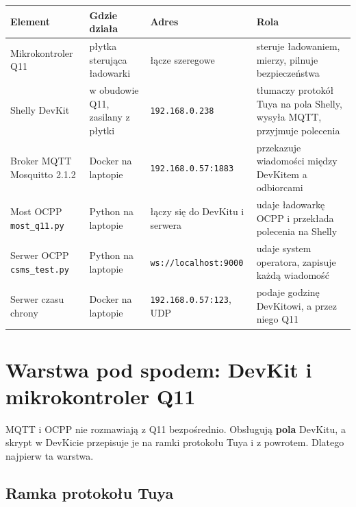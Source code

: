 \documentclass[11pt,a4paper]{article}
\begin{document}
\begin{longtable}{>{\raggedright\arraybackslash}p{3.00cm}>{\raggedright\arraybackslash}p{2.87cm}>{\raggedright\arraybackslash}p{2.57cm}>{\raggedright\arraybackslash}p{6.39cm}}
\toprule
\rowcolor{apteallight}\textbf{Element} & \textbf{Gdzie działa} & \textbf{Adres} & \textbf{Rola} \\
\midrule\endhead
\bottomrule\endfoot
Mikrokontroler Q11 & płytka sterująca ładowarki & łącze szeregowe & steruje ładowaniem, mierzy, pilnuje bezpieczeństwa \\
Shelly DevKit & w obudowie Q11, zasilany z płytki & \texttt{192.\allowbreak{}168.\allowbreak{}0.\allowbreak{}238} & tłumaczy protokół Tuya na pola Shelly, wysyła MQTT, przyjmuje polecenia \\
Broker MQTT Mosquitto 2.1.2 & Docker na laptopie & \texttt{192.\allowbreak{}168.\allowbreak{}0.\allowbreak{}57:\allowbreak{}1883} & przekazuje wiadomości między DevKitem a odbiorcami \\
Most OCPP \texttt{most\_q11.py} & Python na laptopie & łączy się do DevKitu i serwera & udaje ładowarkę OCPP i przekłada polecenia na Shelly \\
Serwer OCPP \texttt{csms\_test.py} & Python na laptopie & \texttt{ws:\allowbreak{}/\allowbreak{}/\allowbreak{}localhost:\allowbreak{}9000} & udaje system operatora, zapisuje każdą wiadomość \\
Serwer czasu chrony & Docker na laptopie & \texttt{192.\allowbreak{}168.\allowbreak{}0.\allowbreak{}57:\allowbreak{}123}, UDP & podaje godzinę DevKitowi, a przez niego Q11 \\
\end{longtable}

\section{Warstwa pod spodem: DevKit i mikrokontroler Q11}

MQTT i OCPP nie rozmawiają z Q11 bezpośrednio. Obsługują \textbf{pola} DevKitu, a skrypt w DevKicie przepisuje je na ramki protokołu Tuya i z powrotem. Dlatego najpierw ta warstwa.


\subsection{Ramka protokołu Tuya}
\end{document}
